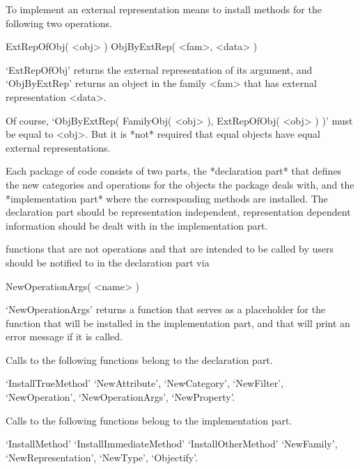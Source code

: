 To implement an external representation means to install methods for the
following two operations.

\>ExtRepOfObj( <obj> )
\>ObjByExtRep( <fam>, <data> )

`ExtRepOfObj' returns the external representation of its argument,
and `ObjByExtRep' returns an object in the family <fam> that has
external representation <data>.

Of course, `ObjByExtRep( FamilyObj( <obj> ), ExtRepOfObj( <obj> ) )'
must be equal to <obj>.
But it is *not* required that equal objects have equal external
representations.



Each package of {\GAP} code consists of two parts,
the *declaration part* that defines the new categories and operations for
the objects the package deals with,
and the *implementation part* where the corresponding methods are
installed.
The declaration part should be representation independent,
representation dependent information should be dealt with in the
implementation part.

{\GAP} functions that are not operations and that are intended to be
called by users should be notified to {\GAP} in the declaration part via

\>NewOperationArgs( <name> )

`NewOperationArgs' returns a function that serves as a placeholder
for the function that will be installed in the implementation part,
and that will print an error message if it is called.



Calls to the following functions belong to the declaration part.

`InstallTrueMethod'
`NewAttribute',
`NewCategory',
`NewFilter',
`NewOperation',
`NewOperationArgs',
`NewProperty'.

Calls to the following functions belong to the implementation part.

`InstallMethod'
`InstallImmediateMethod'
`InstallOtherMethod'
`NewFamily',
`NewRepresentation',
`NewType',
`Objectify'.


